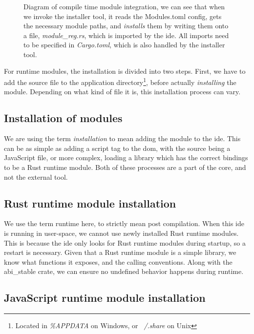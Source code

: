 \begin{figure}
  \centering
  
  \caption{
    Diagram of compile time module integration, we can see that when we invoke
    the installer tool, it reads the Modules.toml config, gets the necessary
    module paths, and \textit{installs} them by writing them onto a file,
    \textit{module\_reg.rs}, which is imported by the \gls*{ide}. All imports
    need to be specified in \textit{Cargo.toml}, which is also handled by the
    installer tool.
  }
  \label{fig:compMod}
\end{figure}

For runtime modules, the installation is divided into two steps. First, we have
to add the source file to the application directory\footnote{Located in \textit{\%APPDATA} on Windows, or \textit{~/.share} on Unix},
before actually \textit{installing} the module. Depending on what kind of file
it is, this installation process can vary.


\subsection{Installation of modules}
We are using the term \textit{installation} to mean adding the module to the
\gls*{ide}. This can be as simple as adding a script tag to the \gls*{dom}, with
the source being a JavaScript file, or more complex, loading a library which has
the correct bindings to be a Rust runtime module. Both of these processes are a
part of the core, and not the external tool.


\subsection{Rust runtime module installation}

We use the term runtime here, to strictly mean post compilation. When this
\gls*{ide} is running in user-space, we cannot use newly installed Rust
runtime modules. This is because the \gls*{ide} only looks for Rust runtime
modules during startup, so a restart is necessary. Given that a Rust runtime
module is a simple library, we know what functions it exposes, and the calling
conventions. Along with the abi\_stable crate, we can ensure no undefined
behavior happens during runtime.

\subsection{JavaScript runtime module installation}

